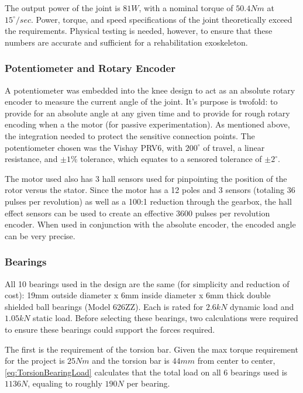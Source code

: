 The output power of the joint is \(81 W\), with a nominal torque of \(50.4 Nm\) at \(15^\circ/sec\). Power, torque, and speed specifications of the joint theoretically exceed the requirements. Physical testing is needed, however, to ensure that these numbers are accurate and sufficient for a rehabilitation exoskeleton.
 
\subsubsection{Potentiometer and Rotary Encoder}
A potentiometer was embedded into the knee design to act as an absolute rotary encoder to measure the current angle of the joint. It's purpose is twofold: to provide for an absolute angle at any given time and to provide for rough rotary encoding when a the motor (for passive experimentation). As mentioned above, the integration needed to protect the sensitive connection points. The potentiometer chosen was the Vishay PRV6, with \(200^\circ\) of travel, a linear resistance, and \(\pm 1\%\) tolerance, which equates to a sensored tolerance of \(\pm 2^\circ\). 

The motor used also has 3 hall sensors used for pinpointing the position of the rotor versus the stator. Since the motor has a 12 poles and 3 sensors (totaling 36 pulses per revolution) as well as a 100:1 reduction through the gearbox, the hall effect sensors can be used to create an effective 3600 pulses per revolution encoder. When used in conjunction with the absolute encoder, the encoded angle can be very precise.


\subsubsection{Bearings}
\label{sec:BearingsAndCalcs}
All 10 bearings used in the design are the same (for simplicity and reduction of cost): 19mm outside diameter x 6mm inside diameter x 6mm thick double shielded ball bearings (Model 626ZZ). Each is rated for \(2.6kN\) dynamic load and \(1.05kN\) static load. Before selecting these bearings, two calculations were required to ensure these bearings could support the forces required.

The first is the requirement of the torsion bar. Given the max torque requirement for the project is \(25Nm\) and the torsion bar is \(44mm\) from center to center, \autoref{eq:TorsionBearingLoad} calculates that the total load on all 6 bearings used is \(1136N\), equaling to roughly \(190N\) per bearing.


